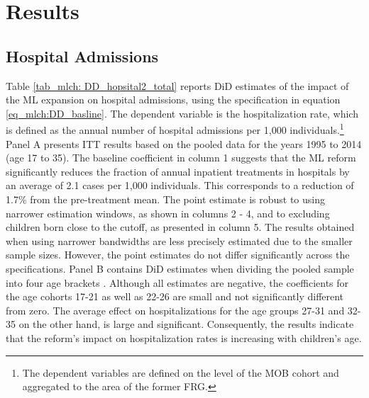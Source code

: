 \section{Results}\label{sec_mlch:results}

\subsection{Hospital Admissions}


Table \ref{tab_mlch: DD_hopsital2_total} reports DiD estimates of the impact of the ML expansion on hospital admissions, using the specification in equation \ref{eq_mlch:DD_basline}. The dependent variable is the hospitalization rate, which is defined as the annual number of hospital admissions per 1,000 individuals.\footnote{The dependent variables are defined on the level of the MOB cohort and aggregated to the area of the former FRG.} Panel A presents ITT results based on the pooled data for the years 1995 to 2014 (age 17 to 35). The baseline coefficient in column 1 suggests that the ML reform significantly reduces the fraction of annual inpatient treatments in hospitals by an average of 2.1 cases per 1,000 individuals. This corresponds to a reduction of 1.7\% from the pre-treatment mean. The point estimate is robust to using narrower estimation windows, as shown in columns 2 - 4, and to excluding children born close to the cutoff, as presented in column 5. The results obtained when using narrower bandwidths are less precisely estimated due to the smaller sample sizes. However, the point estimates do not differ significantly across the specifications. Panel B contains DiD estimates when dividing the pooled sample into four age brackets \label{rev_mlch: editor_comprehension_interaction}. Although all estimates are negative, the coefficients for the age cohorts 17-21 as well as 22-26 are small and not significantly different from zero. The average effect on hospitalizations for the age groups 27-31 and 32-35 on the other hand, is large and significant. Consequently, the results indicate that the reform's impact on hospitalization rates is increasing with children's age.





